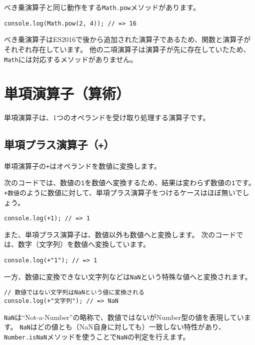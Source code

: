 べき乗演算子と同じ動作をする\texttt{Math.pow}メソッドがあります。

\begin{lstlisting}
console.log(Math.pow(2, 4)); // => 16
\end{lstlisting}

べき乗演算子はES2016で後から追加された演算子であるため、関数と演算子がそれぞれ存在しています。
他の二項演算子は演算子が先に存在していたため、\texttt{Math}には対応するメソッドがありません。

\hypertarget{unary-operator}{%
\section{単項演算子（算術）}\label{unary-operator}}

単項演算子は、1つのオペランドを受け取り処理する演算子です。

\hypertarget{unary-plus-operator}{%
\subsection{\texorpdfstring{単項プラス演算子（\texttt{+}）}{単項プラス演算子（+）}}\label{unary-plus-operator}}

単項演算子の\texttt{+}はオペランドを数値に変換します。

次のコードでは、数値の\texttt{1}を数値へ変換するため、結果は変わらず数値の\texttt{1}です。
\texttt{+数値}のように数値に対して、単項プラス演算子をつけるケースはほぼ無いでしょう。

\begin{lstlisting}
console.log(+1); // => 1
\end{lstlisting}

また、単項プラス演算子は、数値以外も数値へと変換します。
次のコードでは、数字（文字列）を数値へ変換しています。

\begin{lstlisting}
console.log(+"1"); // => 1
\end{lstlisting}

一方、数値に変換できない文字列などは\texttt{NaN}という特殊な値へと変換されます。

\begin{lstlisting}
// 数値ではない文字列はNaNという値に変換される
console.log(+"文字列"); // => NaN
\end{lstlisting}

\texttt{NaN}は``Not-a-Number''の略称で、数値ではないがNumber型の値を表現しています。
\texttt{NaN}はどの値とも（NaN自身に対しても）一致しない特性があり、\texttt{Number.isNaN}メソッドを使うことで\texttt{NaN}の判定を行えます。

